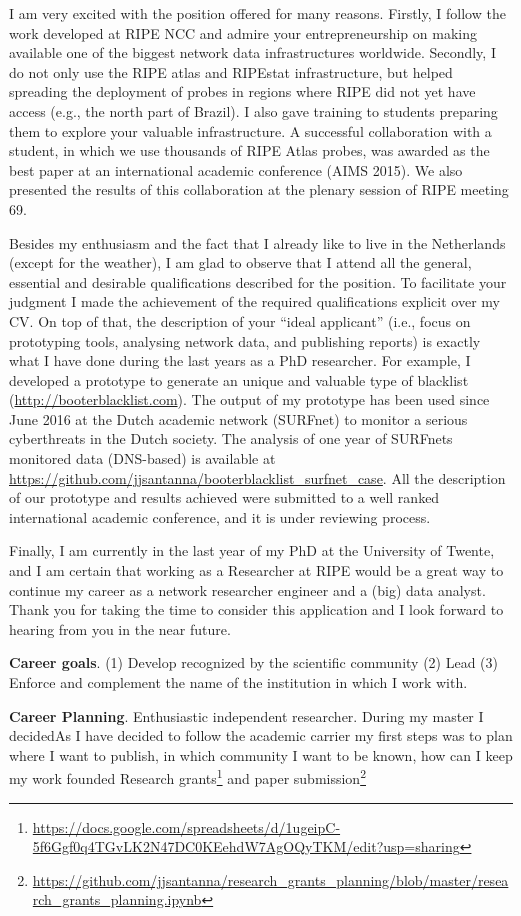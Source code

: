 \documentclass[10pt,a4paper,sans]{libs/moderncv}%
\begin{document}

I am very excited with the position offered for many reasons. Firstly, I follow
the work developed at RIPE NCC and admire your entrepreneurship on making
available one of the biggest network data infrastructures worldwide. Secondly, I
do not only use the RIPE atlas and RIPEstat infrastructure, but helped spreading
the deployment of probes in regions where RIPE did not yet have access (e.g.,
the north part of Brazil). I also gave training to students preparing them to
explore your valuable infrastructure. A successful collaboration with a student,
in which we use thousands of RIPE Atlas probes, was awarded as the best paper at
an international academic conference (AIMS 2015). We also presented the results
of this collaboration at the plenary session of RIPE meeting 69.

Besides my enthusiasm and the fact that I already like to live in the
Netherlands (except for the weather), I am glad to observe that I attend all the
general, essential and desirable qualifications described for the position. To
facilitate your judgment I made the achievement of the required qualifications
explicit over my CV. On top of that, the description of your ``ideal applicant''
(i.e., focus on prototyping tools, analysing network data, and publishing
reports) is exactly what I have done during the last years as a PhD researcher.
For example, I developed a prototype to generate an unique and valuable type of
blacklist (\url{http://booterblacklist.com}). The output of my prototype has
been used since June 2016 at the Dutch academic network (SURFnet) to monitor a
serious cyberthreats in the Dutch society. The analysis of one year of SURFnets
monitored data (DNS-based) is available at
\url{https://github.com/jjsantanna/booterblacklist_surfnet_case}. All the
description of our prototype and results achieved were submitted to a well
ranked international academic conference, and it is under reviewing process.

Finally, I am currently in the last year of my PhD at the University of Twente,
and I am certain that working as a Researcher at RIPE would be a great way to
continue my career as a network researcher engineer and a (big) data analyst.
Thank you for taking the time to consider this application and I look forward to
hearing from you in the near future.

\textbf{Career goals}. (1) Develop
recognized by the scientific community 
(2) Lead
(3) Enforce and complement the name of the institution in which I work with.


\textbf{Career Planning}. Enthusiastic independent researcher. During my master
I decidedAs I have decided to follow the academic carrier my first steps was to
plan where I want to publish, in which community I want to be known, how can I
keep my work founded 	Research
grants\footnote{\url{https://docs.google.com/spreadsheets/d/1ugeipC-5f6Ggf0q4TGvLK2N47DC0KEehdW7AgOQyTKM/edit?usp=sharing}}
and paper
submission\footnote{\url{https://github.com/jjsantanna/research_grants_planning/blob/master/research_grants_planning.ipynb}} 



\makeletterclosing
\end{document}
